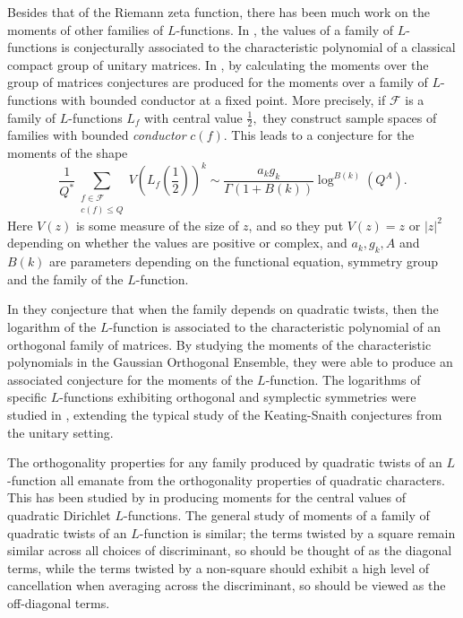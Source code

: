 \documentclass[12pt]{amsart}
\numberwithin{equation}{section}
\numberwithin{thm}{section}
\newcommand{\1}{\mathbf 1}
\begin{document}
Besides that of the Riemann zeta function, there has been much work on the moments of other families of $L$-functions. In \cite{KzS}, the values of a family of $L$-functions is conjecturally associated to the characteristic polynomial of a classical compact group of unitary matrices. In \cite{CF}, by calculating the moments over the group of matrices conjectures are produced for the moments over a family of $L$-functions with bounded conductor at a fixed point. More precisely, if $\mathscr{F}$ is a family of $L$-functions $L_f$ with central value $\frac{1}{2},$ they construct sample spaces of families with bounded \textit{conductor} $c(f).$  This leads to a conjecture for the moments of the shape
\begin{equation}\label{momconjgen}
	\frac{1}{Q^\ast} \sum_{\substack{f\in \mathscr{F}\\
		c(f)\le Q}}V\left(L_f\left(\frac{1}{2}\right)\right)^k\sim \frac{a_kg_k}{\Gamma (1+B(k))}\log ^{B(k)}\left(Q^A\right). 
\end{equation}
Here $V(z)$ is some measure of the size of $z$, and so they put $V(z)=z$ or $|z|^2 $ depending on whether the values are positive or complex, and $a_k,g_k, A$ and $B(k)$ are parameters depending on the functional equation, symmetry group and the family of the $L$-function.
 
 In \cite{KS2} they conjecture that when the family depends on quadratic twists, then the logarithm of the $L$-function is associated to the characteristic polynomial of an orthogonal family of matrices. By studying the moments of the characteristic polynomials in the Gaussian Orthogonal Ensemble, they were able to produce an associated conjecture for the moments of the $L$-function. The logarithms of specific $L$-functions exhibiting orthogonal and symplectic symmetries were studied in \cite{Hough14}, extending the typical study of the Keating-Snaith conjectures from the unitary setting.

The orthogonality properties for any family produced by quadratic twists of an $L$-function all emanate from the orthogonality properties of quadratic characters. This has been studied by \cite{GZ24} in producing moments for the central values of quadratic Dirichlet $L$-functions. The general study of moments of a family of quadratic twists of an  $L$-function is similar; the terms twisted by a square remain similar across all choices of discriminant, so should be thought of as the diagonal terms, while the terms twisted by a non-square should exhibit a high level of cancellation when averaging across the discriminant, so should be viewed as the off-diagonal terms.
\end{document}
